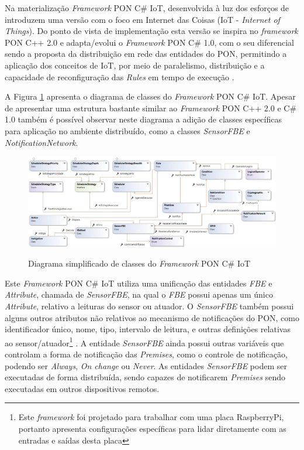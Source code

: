 Na materialização \textit{Framework} PON C\# IoT, desenvolvida à luz dos
esforços de  introduzem uma versão com o foco em
Internet das Coisas (IoT - \textit{Internet of Things}). Do ponto de vista de
implementação esta versão se inspira no \textit{framework} PON C++ 2.0 e
adapta/evolui o \textit{Framework} PON C\# 1.0, com o seu diferencial sendo a
proposta da distribuição em rede das entidades do PON, permitindo a aplicação
dos conceitos de IoT, por meio de paralelismo, distribuição e a capacidade de
reconfiguração das \textit{Rules} em tempo de execução \cite{msc_oliveira_2019}.

A Figura \ref{fig:classes_pon_iot} apresenta o diagrama de classes do
\textit{Framework} PON C\# IoT. Apesar de apresentar uma estrutura bastante
similar ao \textit{Framework} PON C++ 2.0 e C\# 1.0 também é possível observar
neste diagrama a adição de classes específicas para aplicação no ambiente
distribuído, como a classes \textit{SensorFBE} e \textit{NotificationNetwork}.

\begin{figure}[!htb]
  \centering
  \caption{Diagrama simplificado de classes do \textit{Framework} PON C\# IoT}
  \includegraphics[width=\textwidth]{../figures/classes_pon_iot.png}
  \label{fig:classes_pon_iot}
\end{figure}

Este \textit{Framework} PON C\# IoT utiliza uma unificação das entidades
\textit{FBE} e \textit{Attribute}, chamada de \textit{SensorFBE}, na qual o
\textit{FBE} possui apenas um único \textit{Attribute}, relativo a leituras do
sensor ou atuador. O \textit{SensorFBE} também possui alguns outros atributos
não relativos ao mecanismo de notificações do PON, como identificador único,
nome, tipo, intervalo de leitura, e outras definições relativas ao
sensor/atuador\footnote{Este \textit{framework} foi projetado para trabalhar com
uma placa RaspberryPi, portanto apresenta configurações específicas para lidar
diretamente com as entradas e saídas desta placa} \cite{msc_oliveira_2019}. A
entidade \textit{SensorFBE} ainda possui outras variáveis que controlam a forma
de notificação das \textit{Premises}, como o controle de notificação, podendo
ser \textit{Always}, \textit{On change} ou \textit{Never}. As entidades
\textit{SensorFBE} podem ser executadas de forma distribuída, sendo capazes de
notificarem \textit{Premises} sendo executadas em outros dispositivos remotos.

